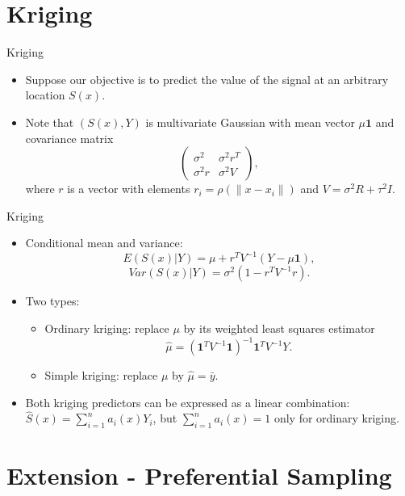 \documentclass{beamer}
\begin{document}
\section{Kriging}
\begin{frame}{Kriging}
	\begin{itemize}
		
		\item Suppose our objective is to predict the value of the signal at an arbitrary location $S(x)$.
		
		\item Note that $(S(x), Y)$ is multivariate Gaussian with mean vector $\mu \mathbf{1}$ and covariance matrix
		$$
		\begin{pmatrix}
		\sigma^2 & \sigma^2 r^T\\
		\sigma^2 r & \sigma^2 V
		\end{pmatrix},
		$$
		where $r$ is a vector with elements $r_i = \rho(\|x-x_i\|)$ and $V = \sigma^2 R + \tau^2 I$.
		
		
	\end{itemize}
\end{frame}

\begin{frame}{Kriging}
	\begin{itemize}
		
		\item Conditional mean and variance:
		$$E(S(x) | Y) = \mu + r^T V^{-1}(Y - \mu \mathbf{1}),$$
		$$Var(S(x) | Y) = \sigma^2 (1 - r^T V^{-1} r).$$
		
		\item Two types:
		\begin{itemize} 
			\item Ordinary kriging: replace $\mu$ by its weighted least squares estimator
			$$\hat{\mu} = (\mathbf{1}^T V^{-1} \mathbf{1})^{-1} \mathbf{1}^T V^{-1} Y.$$
			
			\item Simple kriging: replace $\mu$ by $\hat{\mu} = \bar{y}$.
		\end{itemize}
		
		
		
		\item Both kriging predictors can be expressed as a linear combination: $\hat{S}(x) = \sum_{i=1}^{n}a_i(x) Y_i$, but $\sum_{i=1}^{n}a_i(x)=1$ only for ordinary kriging.
	\end{itemize}
\end{frame}
\section{Extension - Preferential Sampling}
\end{document}

